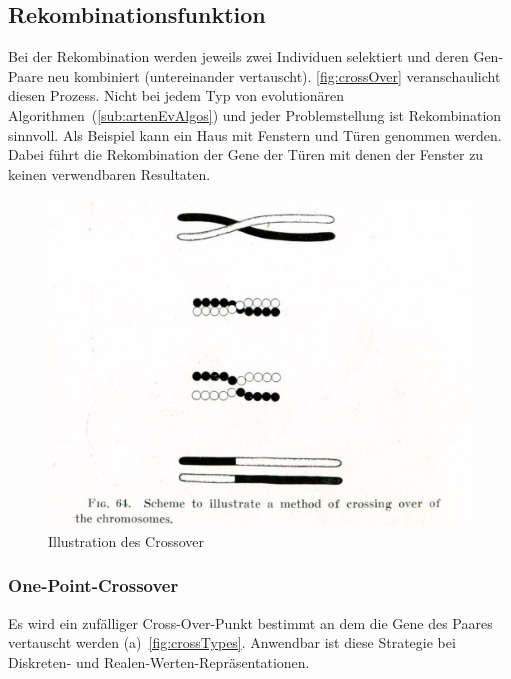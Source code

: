     \subsection{Rekombinationsfunktion}

      Bei der Rekombination werden jeweils zwei Individuen selektiert und
      deren Gen-Paare neu kombiniert (untereinander vertauscht).
      \vref{fig:crossOver} veranschaulicht diesen Prozess.
      Nicht bei jedem Typ von evolutionären Algorithmen~(\vref{sub:artenEvAlgos}) und
      jeder Problemstellung ist Rekombination sinnvoll.
      Als Beispiel kann ein Haus mit Fenstern und Türen genommen werden.
      Dabei führt die Rekombination der Gene der Türen mit denen der Fenster zu keinen verwendbaren Resultaten.

      \begin{figure}[H]
        \includegraphics[scale=0.3,center]{graphics/morgan_crossover}
        \caption[\protect{}]{Illustration des Crossover\label{fig:crossOver}}
      \end{figure}

      \subsubsection{One-Point-Crossover}

        Es wird ein zufälliger Cross-Over-Punkt bestimmt an dem die Gene des Paares vertauscht werden (a)~\vref{fig:crossTypes}.
        Anwendbar ist diese Strategie bei Diskreten- und Realen-Werten-Repräsentationen.

